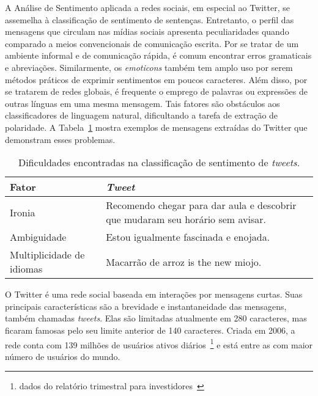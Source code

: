 A Análise de Sentimento aplicada a redes sociais, em especial ao Twitter, se
assemelha à classificação de sentimento de sentenças.
Entretanto, o perfil das mensagens que circulam nas mídias sociais apresenta
peculiaridades quando comparado a meios convencionais de comunicação escrita.
Por se tratar de um ambiente informal e de comunicação rápida, é comum encontrar
erros gramaticais e abreviações.
Similarmente, os \textit{emoticons} também tem amplo uso por serem métodos
práticos de exprimir sentimentos em poucos caracteres.
Além disso, por se tratarem de redes globais, é frequente o emprego de palavras
ou expressões de outras línguas em uma mesma mensagem.
Tais fatores são obstáculos aos classificadores de linguagem natural,
dificultando a tarefa de extração de polaridade.
A Tabela~\ref{tab:sentiment_complexity} mostra exemplos de mensagens extraídas
do Twitter que demonstram esses problemas.

\begin{table}[h]
    \begin{center}
        \caption{Dificuldades encontradas na classificação de sentimento de
                 \textit{tweets}.}
        \begin{tabular}{| l | p{10cm} |}
        \hline
        \textbf{Fator} & \textbf{\textit{Tweet}} \\ \hline
        Ironia & Recomendo chegar para dar aula e descobrir que mudaram seu horário sem avisar. \\ \hline
        Ambiguidade & Estou igualmente fascinada e enojada. \\ \hline
        Multiplicidade de idiomas & Macarrão de arroz is the new miojo. \\ \hline
        \end{tabular}
        \label{tab:sentiment_complexity}
    \end{center}
\end{table}

O Twitter é uma rede social baseada em interações por mensagens curtas.
Suas principais características são a brevidade e instantaneidade das mensagens,
também chamadas \textit{tweets}.
Elas são limitadas atualmente em 280 caracteres, mas ficaram famosas pelo seu
limite anterior de 140 caracteres.
Criada em 2006, a rede conta com 139 milhões de usuários ativos
diários~\footnote{dados do relatório trimestral para
investidores~\cite{twitterreport19}} e está entre
as com maior número de usuários do mundo.

